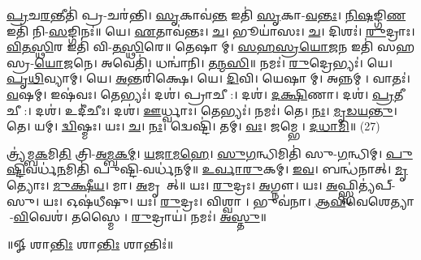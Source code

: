 \ul{𑌪𑍍𑌰}𑌚\ul{𑌰}𑌨𑍍𑌤𑍀𑌤𑌿॑ 𑌪𑍍𑌰-𑌚𑌰॑𑌨𑍍𑌤𑌿। \ul{𑌸𑍃}𑌕𑌾𑌵॑\ul{𑌨𑍍𑌤} 𑌇𑌤𑌿॑ \ul{𑌸𑍃}𑌕𑌾-\ul{𑌵}\ul{𑌨𑍍𑌤𑌃}। \ul{𑌨𑌿}\ul{𑌷}𑌙𑍍𑌗𑌿\ul{𑌣} 𑌇𑌤𑌿॑ 𑌨𑌿-\ul{𑌸}𑌙𑍍𑌗𑌿𑌨𑌃॑॥ 
𑌯𑍇। \ul{𑌏}𑌤𑌾𑌵॑𑌨𑍍𑌤𑌃। \ul{𑌚}। 𑌭𑍂𑌯𑌾॑𑌸𑌃। \ul{𑌚}। 𑌦𑌿𑌶𑌃॑। \ul{𑌰𑍁}𑌦𑍍𑌰𑌾𑌃। \ul{𑌵𑌿}\ul{𑌤}\ul{𑌸𑍍𑌥𑌿}𑌰 𑌇𑌤𑌿॑ 𑌵𑌿-\ul{𑌤}\ul{𑌸𑍍𑌥𑌿}𑌰𑍇॥ 
𑌤𑍇𑌷𑌾𑌮𑍍। \ul{𑌸}\ul{𑌹}\ul{𑌸𑍍𑌰}\ul{𑌯𑍋}\ul{𑌜}𑌨 𑌇𑌤𑌿॑ 𑌸𑌹𑌸𑍍𑌰-\ul{𑌯𑍋}\ul{𑌜}𑌨𑍇। 𑌅𑌵𑍇𑌤𑌿॑। 𑌧𑌨𑍍𑌵𑌾॑𑌨𑌿। \ul{𑌤}\ul{𑌨𑍍𑌮}\ul{𑌸𑌿}॥ 
𑌨𑌮𑌃॑। \ul{𑌰𑍁}𑌦𑍍𑌰𑍇𑌭𑍍𑌯𑌃॑। 𑌯𑍇। \ul{𑌪𑍃}\ul{𑌥𑌿}𑌵𑍍𑌯𑌾𑌮𑍍। 𑌯𑍇। \ul{𑌅}𑌨𑍍𑌤𑌰𑌿॑𑌕𑍍𑌷𑍇। 𑌯𑍇। \ul{𑌦𑌿}𑌵𑌿। 𑌯𑍇𑌷𑌾𑌮𑍍। 𑌅𑌨𑍍𑌨𑌮𑍍। 𑌵𑌾𑌤𑌃॑। \ul{𑌵}\ar{}𑌷𑌮𑍍।
 𑌇𑌷॑𑌵𑌃। 𑌤𑍇𑌭𑍍𑌯𑌃॑। 𑌦𑌶॑। 𑌪𑍍𑌰𑌾𑌚𑍀:। 𑌦𑌶॑। \ul{𑌦}\ul{𑌕𑍍𑌷𑌿}𑌣𑌾। 𑌦𑌶॑। \ul{𑌪𑍍𑌰}𑌤𑍀𑌚𑍀:। 𑌦𑌶॑। 𑌉𑌦𑍀॑𑌚𑍀𑌃। 𑌦𑌶॑। \ul{𑌊}𑌰𑍍𑌧𑍍𑌵𑌾𑌃।
  𑌤𑍇𑌭𑍍𑌯𑌃॑। 𑌨𑌮𑌃॑। 𑌤𑍇। \ul{𑌨𑌃}। \ul{𑌮𑍃}\ul{𑌡}\ul{𑌯}\ul{𑌨𑍍𑌤𑍁}। 𑌤𑍇। 𑌯𑌮𑍍। \ul{𑌦𑍍𑌵𑌿}𑌷𑍍𑌮𑌃। 𑌯𑌃। \ul{𑌚}। \ul{𑌨𑌃}। 𑌦𑍍𑌵𑍇𑌷𑍍𑌟𑌿॑। 𑌤𑌮𑍍। \ul{𑌵𑌃}। 𑌜𑌮𑍍𑌭𑍇। \ul{𑌦}\ul{𑌧𑌾}\ul{𑌮𑌿}॥ (27)

𑌤𑍍𑌰𑍍𑌯॑𑌮𑍍𑌬\ul{𑌕}𑌮𑌿\ul{𑌤𑌿} 𑌤𑍍𑌰𑌿-\ul{𑌅}\ul{𑌮𑍍𑌬}\ul{𑌕}\ul{𑌮𑍍}। \ul{𑌯}\ul{𑌜𑌾}\ul{𑌮}\ul{𑌹𑍇}। \ul{𑌸𑍁}\ul{𑌗}𑌨𑍍𑌧𑌿𑌮𑌿𑌤𑌿॑ 𑌸𑍁-\ul{𑌗}𑌨𑍍𑌧𑌿𑌮𑍍। \ul{𑌪𑍁}\ul{𑌷𑍍𑌟𑌿}𑌵𑌰𑍍𑌧॑\ul{𑌨}𑌮𑌿𑌤𑌿॑ 𑌪𑍁𑌷𑍍𑌟𑌿-𑌵𑌰𑍍𑌧॑𑌨𑌮𑍍॥ 
\ul{𑌉}\ul{𑌰𑍍𑌵𑌾}\ul{𑌰𑍁}𑌕𑌮𑍍। \ul{𑌇}\ul{𑌵}। 𑌬𑌨𑍍𑌧॑𑌨𑌾𑌤𑍍। \ul{𑌮𑍃}𑌤𑍍𑌯𑍋𑌃। \ul{𑌮𑍁}\ul{𑌕𑍍𑌷𑍀}\ul{𑌯}। 𑌮𑌾। \ul{𑌅}𑌮𑍃𑌤𑌾᳚𑌤𑍍॥ 
𑌯𑌃। \ul{𑌰𑍁}𑌦𑍍𑌰𑌃। \ul{𑌅}𑌗𑍍𑌨𑍗। 𑌯𑌃। \ul{𑌅}𑌫𑍍𑌸𑍍𑌵𑌿𑌤𑍍𑌯॑𑌪𑍍-𑌸𑍁। 𑌯𑌃। 𑌓𑌷॑𑌧𑍀𑌷𑍁। 𑌯𑌃। \ul{𑌰𑍁}𑌦𑍍𑌰𑌃। 𑌵𑌿𑌶𑍍𑌵𑌾। 𑌭𑍁𑌵॑𑌨𑌾। \ul{𑌆}\ul{𑌵𑌿}𑌵𑍇𑌶𑍇𑌤𑍍𑌯𑌾-\ul{𑌵𑌿}𑌵𑍇𑌶॑। 𑌤𑌸𑍍𑌮𑍈। \ul{𑌰𑍁}𑌦𑍍𑌰𑌾𑌯॑। 𑌨𑌮𑌃॑। \ul{𑌅}\ul{𑌸𑍍𑌤𑍁}॥

\centerline{॥𑍐 𑌶𑌾\ul{𑌨𑍍𑌤𑌿𑌃} 𑌶𑌾\ul{𑌨𑍍𑌤𑌿𑌃} 𑌶𑌾𑌨𑍍𑌤𑌿𑌃॑॥}


